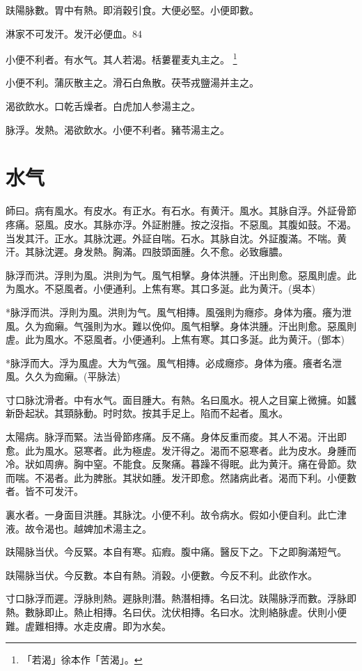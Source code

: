 \documentclass[12pt,twoside,UTF8,b5paper]{ctexbook}
\begin{document}
趺陽脉數。胃中有熱。即消穀引食。大便必堅。小便即數。

淋家不可发汗。发汗必便血。84

小便不利者。有水气。其人若渴。栝蔞瞿麦丸主之。
	\footnote{「若渴」徐本作「苦渴」。}

小便不利。蒲灰散主之。滑石白魚散。茯苓戎鹽湯并主之。

渴欲飲水。口乾舌燥者。白虎加人参湯主之。

脉浮。发熱。渴欲飲水。小便不利者。豬苓湯主之。

\chapter{水气}

師曰。病有風水。有皮水。有正水。有石水。有黄汗。風水。其脉自浮。外証骨節疼痛。惡風。皮水。其脉亦浮。外証胕腫。按之沒指。不惡風。其腹如鼓。不渴。当发其汗。正水。其脉沈遲。外証自喘。石水。其脉自沈。外証腹滿。不喘。黄汗。其脉沈遲。身发熱。胸滿。四肢頭面腫。久不愈。必致癰膿。

脉浮而洪。浮則为風。洪則为气。風气相擊。身体洪腫。汗出則愈。惡風則虗。此为風水。不惡風者。小便通利。上焦有寒。其口多涎。此为黄汗。(吳本)

*脉浮而洪。浮則为風。洪則为气。風气相摶。風强則为癮疹。身体为癢。癢为泄風。久为痂癩。气强則为水。難以俛仰。風气相擊。身体洪腫。汗出則愈。惡風則虗。此为風水。不惡風者。小便通利。上焦有寒。其口多涎。此为黄汗。(鄧本)

*脉浮而大。浮为風虗。大为气强。風气相摶。必成癮疹。身体为癢。癢者名泄風。久久为痂癩。(平脉法)

寸口脉沈滑者。中有水气。面目腫大。有熱。名曰風水。視人之目窠上微擁。如蠶新卧起狀。其頸脉動。时时欬。按其手足上。陷而不起者。風水。

太陽病。脉浮而緊。法当骨節疼痛。反不痛。身体反重而痠。其人不渴。汗出即愈。此为風水。惡寒者。此为極虗。发汗得之。渴而不惡寒者。此为皮水。身腫而冷。狀如周痹。胸中窒。不能食。反聚痛。暮躁不得眠。此为黄汗。痛在骨節。欬而喘。不渴者。此为脾胀。其狀如腫。发汗即愈。然諸病此者。渴而下利。小便數者。皆不可发汗。

裏水者。一身面目洪腫。其脉沈。小便不利。故令病水。假如小便自利。此亡津液。故令渴也。越婢加术湯主之。

趺陽脉当伏。今反緊。本自有寒。疝瘕。腹中痛。醫反下之。下之即胸滿短气。

趺陽脉当伏。今反數。本自有熱。消穀。小便數。今反不利。此欲作水。

寸口脉浮而遲。浮脉則熱。遲脉則潛。熱潛相摶。名曰沈。趺陽脉浮而數。浮脉即熱。數脉即止。熱止相摶。名曰伏。沈伏相摶。名曰水。沈則絡脉虗。伏則小便難。虗難相摶。水走皮膚。即为水矣。
\end{document}
